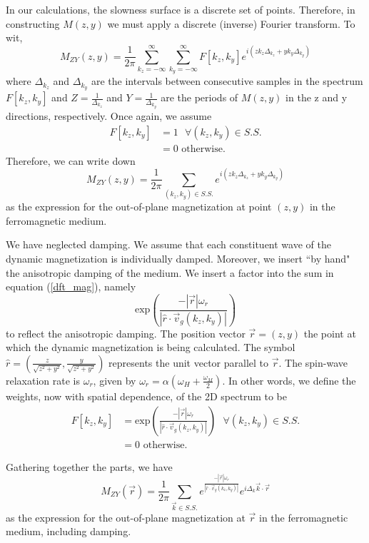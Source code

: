 \documentclass{article}
\begin{document}
In our calculations, the slowness surface is a discrete set of points. Therefore, in constructing $M(z,y)$ we must apply a discrete (inverse) Fourier transform. To wit,
\begin{equation}
M_{Z Y}(z,y) = \frac{1}{2\pi}\sum_{k_{z} = -\infty}^{\infty} \sum_{k_{y} = -\infty}^{\infty} F[k_{z},k_{y}] e^{i (z k_{z} \Delta_{k_{z}} + y k_{y} \Delta_{k_{y}})}
\end{equation}
where $\Delta_{k_{z}}$ and $\Delta_{k_{y}}$ are the intervals between consecutive samples in the spectrum $F[k_{z},k_{y}]$ and $Z = \frac{1}{\Delta_{k_{z}}}$ and $Y = \frac{1}{\Delta_{k_{y}}}$ are the periods of $M(z,y)$ in the z and y directions, respectively. 
Once again, we assume
\begin{align}
F[k_{z},k_{y}] &= 1 \text{  } \forall (k_{z},k_{y}) \in S.S. \\
&= 0 \text{ otherwise.} \nonumber
\end{align}
Therefore, we can write down 
\begin{equation}\label{dft_mag}
M_{Z Y}(z,y) = \frac{1}{2\pi}\sum_{(k_{z},k_{y}) \in S.S.} e^{i (z k_{z} \Delta_{k_{z}} + y k_{y} \Delta_{k_{y}})}
\end{equation}
as the expression for the out-of-plane magnetization at point $(z,y)$ in the ferromagnetic medium.

We have neglected damping.
We assume that each constituent wave of the dynamic magnetization is individually damped. 
Moreover, we insert ``by hand" the anisotropic damping of the medium.
We insert a factor into the sum in equation (\ref{dft_mag}), namely
\begin{equation}
\text{exp}\left(\frac{-|\vec{r}| \omega_{r}}{|\hat{r} \cdot \vec{v}_{g}(k_{z},k_{y}) |}\right)
\end{equation}
to reflect the anisotropic damping. 
The position vector $\vec{r} = (z,y)$  the point at which the dynamic magnetization is being calculated. 
The symbol $\hat{r} = \left(\frac{z}{\sqrt{z^2+y^2}},\frac{y}{\sqrt{z^2+y^2}}\right)$ represents the unit vector parallel to $\vec{r}$. 
The spin-wave relaxation rate is $\omega_{r}$, given by $\omega_{r} = \alpha (\omega_{H} + \frac{\omega_{M}}{2})$.
In other words, we define the weights, now with spatial dependence, of the 2D spectrum to be
\begin{align}
F[k_{z},k_{y}] &= \text{exp}\left(\frac{-|\vec{r}| \omega_{r}}{|\hat{r} \cdot \vec{v}_{g}(k_{z},k_{y}) |}\right) \text{  } \forall (k_{z},k_{y}) \in S.S. \\
&= 0 \text{ otherwise.} \nonumber
\end{align}

Gathering together the parts, we have
\begin{equation}
M_{Z Y}(\vec{r}) = \frac{1}{2\pi}\sum_{\vec{k} \in S.S.} e^{\frac{-|\vec{r}| \omega_{r}}{|\hat{r} \cdot \vec{v}_{g}(k_{z},k_{y}) |}}             e^{i \Delta_{k} \vec{k} \cdot \vec{r}}
\end{equation}
as the expression for the out-of-plane magnetization at $\vec{r}$ in the ferromagnetic medium, including damping.
\end{document}
